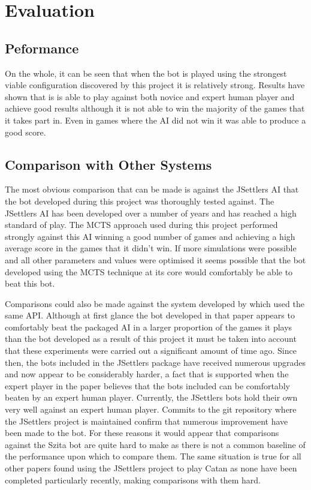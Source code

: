\documentclass[]{article}
\let\oldsection\section
\renewcommand\section{\clearpage\oldsection}
\begin{document}
\section{Evaluation}
\subsection{Peformance}

On the whole, it can be seen that when the bot is played using the strongest viable configuration discovered by this project it is relatively strong. Results have shown that is is able to play against both novice and expert human player and achieve good results although it is not able to win the majority of the games that it takes part in. Even in games where the AI did not win it was able to produce a good score.

\subsection{Comparison with Other Systems}
The most obvious comparison that can be made is against the JSettlers AI that the bot developed during this project was thoroughly tested against. The JSettlers AI has been developed over a number of years and has reached a high standard of play. The MCTS approach used during this project performed strongly against this AI winning a good number of games and achieving a high average score in the games that it didn't win. If more simulations were possible and all other parameters and values were optimised it seems possible that the bot developed using the MCTS technique at its core would comfortably be able to beat this bot.

Comparisons could also be made against the system developed by \textcite{szita2009monte} which used the same API. Although at first glance the bot developed in that paper appears to comfortably beat the packaged AI in a larger proportion of the games it plays than the bot developed as a result of this project it must be taken into account that these experiments were carried out a significant amount of time ago. Since then, the bots included in the JSettlers package have received numerous upgrades and now appear to be considerably harder, a fact that is supported when the expert player in the paper believes that the bots included can be comfortably beaten by an expert human player. Currently, the JSettlers bots hold their own very well against an expert human player. Commits to the git repository where the JSettlers project is maintained confirm that numerous improvement have been made to the bot. For these reasons it would appear that comparisons against the Szita bot are quite hard to make as there is not a common baseline of the performance upon which to compare them. The same situation is true for all other papers found using the JSettlers project to play Catan as none have been completed particularly recently, making comparisons with them hard.  
\end{document}
